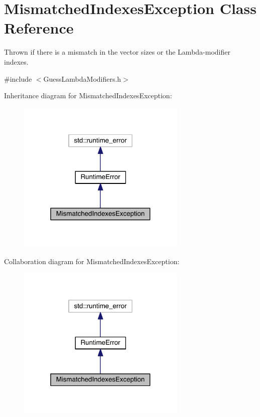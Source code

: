 \hypertarget{class_mismatched_indexes_exception}{}\section{Mismatched\+Indexes\+Exception Class Reference}
\label{class_mismatched_indexes_exception}


Thrown if there is a mismatch in the vector sizes or the Lambda-\/modifier indexes.  




{\ttfamily \#include $<$Guess\+Lambda\+Modifiers.\+h$>$}



Inheritance diagram for Mismatched\+Indexes\+Exception\+:
\nopagebreak
\begin{figure}[H]
\begin{center}
\leavevmode
\includegraphics[width=229pt]{df/dfa/class_mismatched_indexes_exception__inherit__graph}
\end{center}
\end{figure}


Collaboration diagram for Mismatched\+Indexes\+Exception\+:
\nopagebreak
\begin{figure}[H]
\begin{center}
\leavevmode
\includegraphics[width=229pt]{d5/d05/class_mismatched_indexes_exception__coll__graph}
\end{center}
\end{figure}
